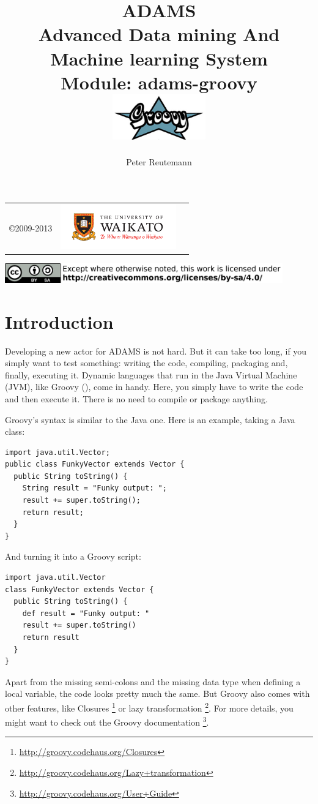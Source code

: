 \documentclass[a4paper]{book}
\title{
  \textbf{ADAMS} \\
  {\Large \textbf{A}dvanced \textbf{D}ata mining \textbf{A}nd \textbf{M}achine
  learning \textbf{S}ystem} \\
  {\Large Module: adams-groovy} \\
  \vspace{1cm}
  \includegraphics[width=4cm]{images/groovy_logo.png} \\
}
\author{
  Peter Reutemann
}
\begin{document}
\begin{titlepage}
\maketitle

\thispagestyle{empty}
\center
\begin{table}[b]
	\begin{tabular}{c l l}
		\parbox[c][2cm]{2cm}{\copyright 2009-2013} &
		\parbox[c][2cm]{5cm}{\includegraphics[width=5cm]{images/coat_of_arms.pdf}} \\
	\end{tabular}
	\includegraphics[width=12cm]{images/cc.png} \\
\end{table}

\end{titlepage}

\tableofcontents

\chapter{Introduction}
Developing a new actor for ADAMS is not hard. But it can take too long, if you
simply want to test something: writing the code, compiling, packaging and,
finally, executing it. Dynamic languages that run in the Java Virtual Machine
(JVM), like Groovy (\cite{groovy}), come in handy. Here, you simply have to
write the code and then execute it. There is no need to compile or package anything.

Groovy's syntax is similar to the Java one. Here is an example, taking a Java
class:
\begin{verbatim}
import java.util.Vector;
public class FunkyVector extends Vector {
  public String toString() {
    String result = "Funky output: ";
    result += super.toString();
    return result;
  }
}
\end{verbatim}
And turning it into a Groovy script:
\begin{verbatim}
import java.util.Vector
class FunkyVector extends Vector {
  public String toString() {
    def result = "Funky output: "
    result += super.toString()
    return result
  }
}
\end{verbatim}
Apart from the missing semi-colons and the missing data type when defining a
local variable, the code looks pretty much the same. But Groovy also comes
with other features, like Closures
\footnote{\url{http://groovy.codehaus.org/Closures}{}}
or lazy transformation
\footnote{\url{http://groovy.codehaus.org/Lazy+transformation}{}}.
For more details, you might want to check out the Groovy documentation
\footnote{\url{http://groovy.codehaus.org/User+Guide}{}}.
\end{document}
